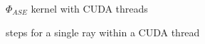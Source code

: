 \begin{figure}[H]
  \centerline
  {}
  \caption{$\Phi_{ASE}$ kernel with CUDA threads}
  \label{graphic:kernel}
\end{figure}

\begin{figure}[H]
  \centerline
  {}
  \caption{steps for a single ray within a CUDA thread}
  \label{graphic:algorithm_steps}
\end{figure}

